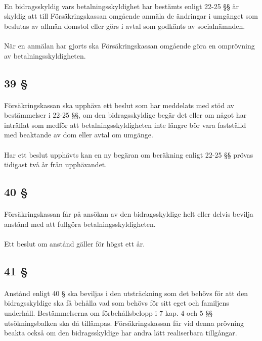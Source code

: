 \documentclass[a4paper,notitlepage,openany,10pt]{book}
\begin{document}
\paragraph*{}
En bidragsskyldig vars betalningsskyldighet har bestämts enligt 22-25 §§ är skyldig att till Försäkringskassan omgående anmäla de ändringar i umgänget som beslutas av allmän domstol eller görs i avtal som godkänts av socialnämnden.
\paragraph*{}
När en anmälan har gjorts ska Försäkringskassan omgående göra en omprövning av betalningsskyldigheten.
\subsection*{39 §}
\paragraph*{}
Försäkringskassan ska upphäva ett beslut som har meddelats med stöd av bestämmelser i 22-25 §§, om den bidragsskyldige begär det eller om något har inträffat som medför att betalningsskyldigheten inte längre bör vara fastställd med beaktande av dom eller avtal om umgänge.
\paragraph*{}
Har ett beslut upphävts kan en ny begäran om beräkning enligt 22-25 §§ prövas tidigast två år från upphävandet.
\subsection*{40 §}
\paragraph*{}
Försäkringskassan får på ansökan av den bidragsskyldige helt eller delvis bevilja anstånd med att fullgöra betalningsskyldigheten.
\paragraph*{}
Ett beslut om anstånd gäller för högst ett år.
\subsection*{41 §}
\paragraph*{}
Anstånd enligt 40 § ska beviljas i den utsträckning som det behövs för att den bidragsskyldige ska få behålla vad som behövs för sitt eget och familjens underhåll. Bestämmelserna om förbehållsbelopp i 7 kap. 4 och 5 §§ utsökningsbalken ska då tillämpas. Försäkringskassan får vid denna prövning beakta också om den bidragsskyldige har andra lätt realiserbara tillgångar.
\end{document}
